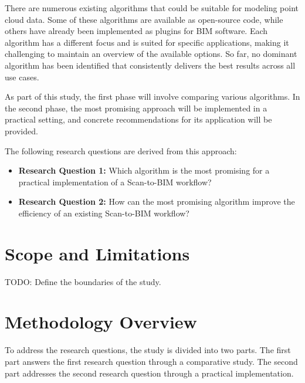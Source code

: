 There are numerous existing algorithms that could be suitable for modeling point cloud data. Some of these algorithms are available as open-source code, while others have already been implemented as plugins for BIM software. Each algorithm has a different focus and is suited for specific applications, making it challenging to maintain an overview of the available options. So far, no dominant algorithm has been identified that consistently delivers the best results across all use cases.

As part of this study, the first phase will involve comparing various algorithms. In the second phase, the most promising approach will be implemented in a practical setting, and concrete recommendations for its application will be provided.

The following research questions are derived from this approach:

\begin{itemize}
    \item \textbf{Research Question 1:} Which algorithm is the most promising for a practical implementation of a Scan-to-BIM workflow?
    \item \textbf{Research Question 2:} How can the most promising algorithm improve the efficiency of an existing Scan-to-BIM workflow?
\end{itemize}



\section{Scope and Limitations}
TODO: Define the boundaries of the study.

\section{Methodology Overview}
\begin{comment}
Für die Beantwortung der Forschungsfragen wird die arbeit in zwei teile unterteilt. im ersten teil wird die erste forschungsfrage mit einer vergleichenden studie beantwortet. im zweiten teil wird die zweite Forschungsfrage durch eine praxisorientierten implementierung beantwortet. \\
\end{comment}
To address the research questions, the study is divided into two parts. The first part answers the first research question through a comparative study. The second part addresses the second research question through a practical implementation.

